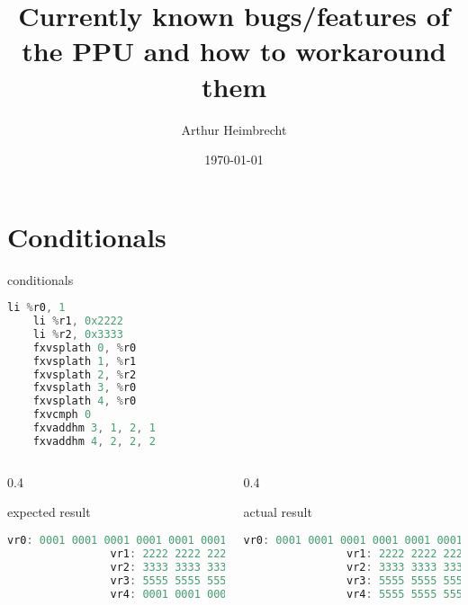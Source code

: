 \documentclass[10pt]{beamer}
\title{Currently known bugs/features of the PPU and how to workaround them}
\author{Arthur Heimbrecht}
\date{\today}
\begin{document}
\begin{frame}
\titlepage
\end{frame}

\begin{frame}
\tableofcontents
\end{frame}


\section{Conditionals}
\begin{frame}[fragile]{conditionals}{}
	\begin{lstlisting}[language=C++,basicstyle=\ttfamily\scriptsize,keywordstyle=\color{red}]
	li %r0, 1
	li %r1, 0x2222
	li %r2, 0x3333
	fxvsplath 0, %r0
	fxvsplath 1, %r1
	fxvsplath 2, %r2
	fxvsplath 3, %r0
	fxvsplath 4, %r0
	fxvcmph 0
	fxvaddhm 3, 1, 2, 1	
	fxvaddhm 4, 2, 2, 2
	\end{lstlisting}
	\begin{columns}[t]
		\begin{column}{0.4\textwidth}
			\begin{block}{expected result}
      			\begin{lstlisting}[language=C++,basicstyle=\fontsize{5}{7}\selectfont\ttfamily,keywordstyle=\color{red}]
				vr0: 0001 0001 0001 0001 0001 0001 0001 0001
				vr1: 2222 2222 2222 2222 2222 2222 2222 2222
				vr2: 3333 3333 3333 3333 3333 3333 3333 3333
				vr3: 5555 5555 5555 5555 5555 5555 5555 5555
				vr4: 0001 0001 0001 0001 0001 0001 0001 0001
				\end{lstlisting}
			\end{block}
    	\end{column}
    	\begin{column}{0.4\textwidth}
    		\begin{block}{actual result}
      			\begin{lstlisting}[language=C++,basicstyle=\fontsize{5}{7}\selectfont\ttfamily,keywordstyle=\color{red}]
				vr0: 0001 0001 0001 0001 0001 0001 0001 0001
				vr1: 2222 2222 2222 2222 2222 2222 2222 2222
				vr2: 3333 3333 3333 3333 3333 3333 3333 3333
				vr3: 5555 5555 5555 5555 5555 5555 5555 5555
				vr4: 5555 5555 5555 5555 5555 5555 5555 5551
				\end{lstlisting}
			\end{block}
    	\end{column}
	\end{columns}
\end{frame}
\end{document}
